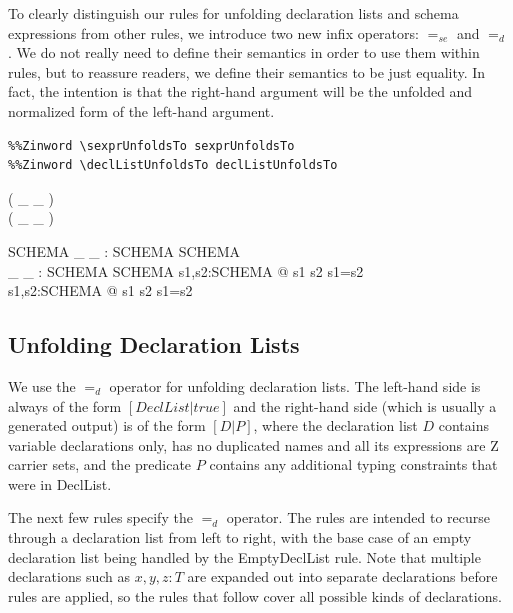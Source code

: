 \documentclass{entcs}
\newcommand{\sexprUnfoldsTo}{\mathrel{=_{se}}}
\newcommand{\declListUnfoldsTo}{\mathrel{=_d}}
\begin{document}
To clearly distinguish our rules for unfolding declaration lists and
schema expressions from other rules, we introduce two new infix
operators: $\sexprUnfoldsTo$ and $\declListUnfoldsTo$.  
We do not really need to define their semantics in order to use them within
rules, but to reassure readers, we define their semantics to be just
equality.  In fact, the intention is that the right-hand argument
will be the unfolded and normalized form of the left-hand argument.

\begin{verbatim}
%%Zinword \sexprUnfoldsTo sexprUnfoldsTo
%%Zinword \declListUnfoldsTo declListUnfoldsTo
\end{verbatim}
%
\begin{zed}
  \relation ( \_ \sexprUnfoldsTo \_ ) \\
  \relation ( \_ \declListUnfoldsTo \_ )
\end{zed}
%
\begin{gendef}{SCHEMA}
  \_ \sexprUnfoldsTo \_ : SCHEMA \rel SCHEMA \\
  \_ \declListUnfoldsTo \_ : SCHEMA \rel SCHEMA
\where
  \forall s1,s2:SCHEMA @ s1 \sexprUnfoldsTo s2 \iff s1=s2 \\
  \forall s1,s2:SCHEMA @ s1 \declListUnfoldsTo s2 \iff s1=s2 \\
\end{gendef}


\subsection{Unfolding Declaration Lists}

We use the $\declListUnfoldsTo$ operator for unfolding declaration
lists.  The left-hand side is always of the form $[DeclList|true]$ and
the right-hand side (which is usually a generated output) is of the
form $[D|P]$, where the declaration list $D$ contains variable
declarations only, has no duplicated names and all its expressions are
Z carrier sets, and the predicate $P$ contains any additional typing
constraints that were in DeclList.

The next few rules specify the $\declListUnfoldsTo$ operator.
The rules are intended to recurse through a declaration list from left
to right, with the base case of an empty declaration list being handled
by the EmptyDeclList rule.  Note that multiple declarations such as
$x,y,z:T$ are expanded out into separate declarations before rules
are applied, so the rules that follow cover all possible kinds
of declarations.
\end{document}
